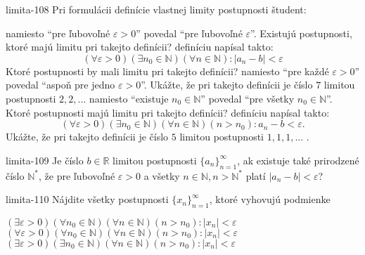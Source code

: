 \begin{defproblem}{limita-108}
Pri formulácii definície vlastnej limity postupnosti študent:
\begin{tasks}
\task
    namiesto \enquote{pre ľubovoľné $\varepsilon > 0$} povedal \enquote{pre
    ľubovoľné $\varepsilon$}. Existujú postupnosti, ktoré majú limitu pri
    takejto definícii?
\task
    definíciu napísal takto:
    \[
        (\forall \varepsilon > 0)
            (\exists n_0 \in \mathbb{N})
                (\forall n \in \mathbb{N}):
                    |a_n - b| < \varepsilon
    \]
    Ktoré postupnosti by mali limitu pri takejto definícii?
\task
    namiesto \enquote{pre každé $\varepsilon > 0$} povedal \enquote{aspoň pre
    jedno $\varepsilon > 0$}. Ukážte, že pri takejto definícii je číslo $7$
    limitou postupnosti $2,2, ...$
\task
    namiesto \enquote{existuje $n_0 \in \mathbb{N}$} povedal \enquote{pre všetky
    $n_0 \in \mathbb{N}$}. Ktoré postupnosti majú limitu pri takejto definícii?
\task
    definíciu napísal takto:
    \[
        (\forall \varepsilon > 0)
            (\exists n_0 \in \mathbb{N})
                (\forall n \in \mathbb{N})
                    (n > n_0): a_n - b < \varepsilon.
    \]
    Ukážte, že pri takejto definícii je číslo $5$ limitou postupnosti $1,1,1,...$ .
\end{tasks}
\end{defproblem}

\begin{defproblem}{limita-109}
Je číslo $b \in \mathbb{R}$ limitou postupnosti ${\{a_n\}}_{n=1}^\infty$, ak
existuje také prirodzené číslo $\mathbb{N^*}$, že pre ľubovoľné $\varepsilon >
0$ a všetky $n \in \mathbb{N}, n > \mathbb{N^*}$ platí $|a_n-b|<\varepsilon$?
\end{defproblem}

\begin{defproblem}{limita-110}
Nájdite všetky postupnosti ${\{x_n\}}_{n=1}^\infty$, ktoré vyhovujú podmienke
\begin{tasks}
\task
    $(\exists \varepsilon > 0)
        (\forall n_0 \in \mathbb{N})
            (\forall n \in \mathbb{N})
                (n > n_0): |x_n| < \varepsilon
    $
\task
    $(\forall \varepsilon > 0)
        (\forall n_0 \in \mathbb{N})
            (\forall n \in \mathbb{N})
                (n > n_0): |x_n| < \varepsilon
    $
\task
    $(\exists \varepsilon > 0)
        (\exists n_0 \in \mathbb{N})
            (\forall n \in \mathbb{N})
                (n > n_0): |x_n| < \varepsilon
    $
\end{tasks}
\end{defproblem}

